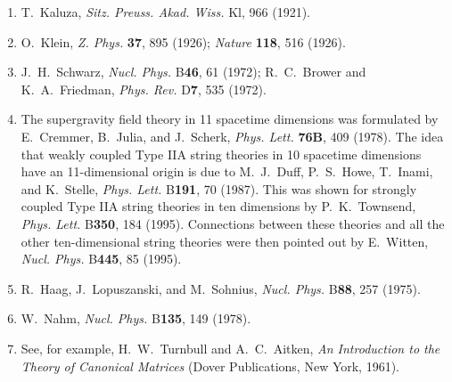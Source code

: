 


\begin{enumerate}
  \item {}\label{ch32-ref-1}
  T.~Kaluza, \textit{Sitz. Preuss. Akad. Wiss.} Kl, 966 (1921).

  \item {}\label{ch32-ref-2}
  O.~Klein, \textit{Z. Phys.} \textbf{37}, 895 (1926);
  \textit{Nature} \textbf{118}, 516 (1926).

  \item {}\label{ch32-ref-3}
  J.~H.~Schwarz, \textit{Nucl. Phys.} B\textbf{46}, 61 (1972);
  R.~C.~Brower and K.~A.~Friedman, \textit{Phys. Rev.} D\textbf{7},
  535 (1972).

  \item {}\label{ch32-ref-4}
  The supergravity field theory in 11 spacetime dimensions was
  formulated by E.~Cremmer, B.~Julia, and J.~Scherk,
  \textit{Phys. Lett.} \textbf{76B}, 409 (1978). The idea that weakly
  coupled Type IIA string theories in 10 spacetime dimensions have an
  11-dimensional origin is due to M.~J.~Duff, P.~S.~Howe, T.~Inami,
  and K.~Stelle, \textit{Phys. Lett.} B\textbf{191}, 70 (1987). This
  was shown for strongly coupled Type IIA string theories in ten
  dimensions by P.~K.~Townsend, \textit{Phys. Lett.} B\textbf{350},
  184 (1995). Connections between these theories and all the other
  ten-dimensional string theories were then pointed out by E.~Witten,
  \textit{Nucl. Phys.} B\textbf{445}, 85 (1995).

  \item {}\label{ch32-ref-5}
  R.~Haag, J.~Lopuszanski, and M.~Sohnius, \textit{Nucl. Phys.}
  B\textbf{88}, 257 (1975).

  \item {}\label{ch32-ref-6}
  W.~Nahm, \textit{Nucl. Phys.} B\textbf{135}, 149 (1978).

  \item[6a.] \label{ch32-ref-6a}
  See, for example, H.~W.~Turnbull and A.~C.~Aitken,
  \textit{An Introduction to the Theory of Canonical Matrices}
  (Dover Publications, New York, 1961).


\end{enumerate}

